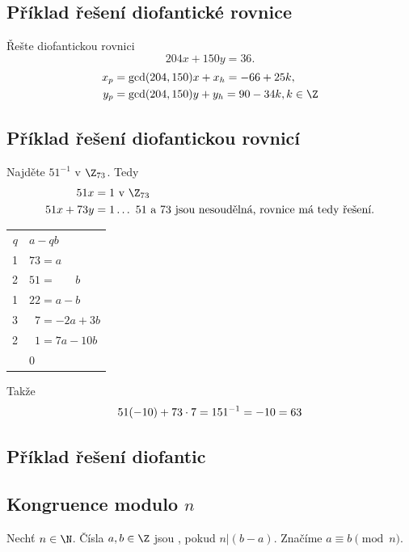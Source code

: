 \subsection{Příklad řešení diofantické rovnice}
Řešte diofantickou rovnici
\begin{equation}
	204x + 150y = 36.
\end{equation}
\begin{align}
	x_p &= \gcd(204, 150)x + x_h = -66 + 25k, \\
	y_p &= \gcd(204, 150)y + y_h = 90 - 34k, k \in \Z
\end{align}

\subsection{Příklad řešení diofantickou rovnicí}
Najděte $51^{-1}$ v $\Z_{73}$.
Tedy
\begin{align}
	51x &= 1 \text{ v } \Z_{73} \\
	51x + 73y &= 1 \dots \text{ 51 a 73 jsou nesoudělná, rovnice má tedy řešení.}
\end{align}
\begin{center}
	\begin{tabular}{r|l}
		$q$ & $a -qb$\\
		1 & $73 = a$ \\
		2 & $51 = \phantom{a +} b$ \\
		1 & $22 = a - b$ \\
		3 & $\phantom{1}7 = -2a + 3b$ \\
		2 & $\phantom{1}1 = 7a - 10b$ \\
		& \phantom{1}0 
	\end{tabular}
\end{center}
Takže
\begin{equation}
	51(-10) + 73 \cdot 7 = 1 \\
	51^{-1} = -10 = 63
\end{equation}

\subsection{Příklad řešení diofantic}

\subsection{Kongruence modulo \texorpdfstring{$n$}{n}}\label{kongruenceMod}
Nechť $n \in \N$. Čísla $a,b \in \Z$ jsou , pokud $n | (b-a)$. Značíme $a \equiv b \pmod{n}$.

